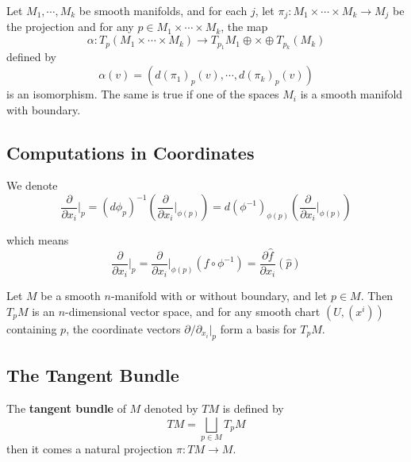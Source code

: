 \begin{proposition}
    Let $M_1,\cdots,M_k$ be smooth manifolds, and for each $j$, let $\pi_j:M_1\times\cdots\times M_k \to M_j$ be the projection and for any $p\in M_1\times\cdots\times M_k$, the map
    \[\alpha:T_p(M_1\times\cdots\times M_k) \to T_{p_1}M_1\oplus\times\oplus T_{p_k}(M_k)\]
    defined by
    \[\alpha(v) = (d(\pi_1)_p(v),\cdots,d(\pi_k)_p(v))\]
    is an isomorphism. The same is true if one of the spaces $M_i$ is a smooth manifold with boundary.
\end{proposition}

\subsection{Computations in Coordinates}

We denote
\[
\dfrac{\partial}{\partial x_i}\Big|_p = (d\phi_p)^{-1}\left(\dfrac{\partial}{\partial x_i}\Big|_{\phi(p)}\right) = d(\phi^{-1})_{\phi(p)}\left(\dfrac{\partial}{\partial x_i}\Big|_{\phi(p)}\right)
\]

which means
\[
\dfrac{\partial}{\partial x_i}\Big|_p = \dfrac{\partial}{\partial x_i}\Big|_{\phi(p)}(f\circ \phi^{-1}) = \dfrac{\partial \hat{f}}{\partial x_i}(\hat{p})
\]

\begin{proposition}
    Let $M$ be a smooth $n$-manifold with or without boundary, and let $p\in M$. Then $T_pM$ is an $n$-dimensional vector space, and for any smooth chart $(U,(x^i))$ containing $p$, the coordinate vectors $\partial/\partial_{x_i}\Big|_p$ form a basis for $T_pM$.
\end{proposition}

\subsection{The Tangent Bundle}

\begin{definition}
    The \textbf{tangent bundle} of $M$ denoted by $TM$ is defined by
    \[TM = \bigsqcup_{p\in M} T_pM\]
    then it comes a natural projection $\pi:TM \to M$.
\end{definition}

